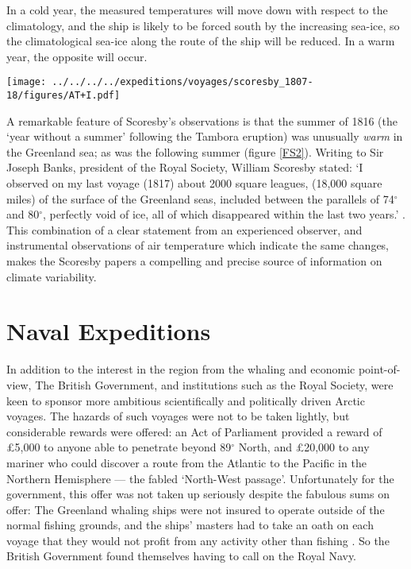 \documentclass[CP]{copernicus}
\begin{document}
In a cold year, the measured temperatures will move down with respect to the climatology, and the ship is likely to be forced south by the increasing sea-ice, so the climatological sea-ice along the route of the ship will be reduced. In a warm year, the opposite will occur.
\begin{figure*}[!hbp]
\begin{center}
\texttt{[image: ../../../../expeditions/voyages/scoresby\_1807-18/figures/AT+I.pdf]}
\caption{Weather observations from William Scoresby's whaling voyages, air temperatures from each of 10 seasons compared with modern values. The red points are the observations, the black and grey lines are the mean, max and min values from modern datasets (monthly averages interpolated to daily, 1979-2004; AT from \citet{rigor97poles}, sea-ice from \citet{rayner03HadISST1}).}
\label{FS2}
\end{center}
\end{figure*}
A remarkable feature of Scoresby's observations is that the summer of 1816 (the `year without a summer' following the Tambora eruption) was unusually {\it warm} in the Greenland sea; as was the following summer (figure \ref{FS2}). Writing to Sir Joseph Banks, president of the Royal Society, William Scoresby stated: `I observed on my last voyage (1817) about 2000 square leagues, (18,000 square miles) of the surface of the Greenland seas, included between the parallels of 74$^\circ$ and 80$^\circ$, perfectly void of ice, all of which disappeared within the last two years.' \citep{barrow_1846}. This combination of a clear statement from an experienced observer, and instrumental observations of air temperature which indicate the same changes, makes the Scoresby papers a compelling and precise source of information on climate variability.

\section{Naval Expeditions}

In addition to the interest in the region from the whaling and economic point-of-view, The British Government, and institutions such as the Royal Society, were keen to sponsor more ambitious scientifically and politically driven Arctic voyages. The hazards of such voyages were not to be taken lightly, but considerable rewards were offered: an Act of Parliament provided a reward of \pounds 5,000 to anyone able to penetrate beyond 89$^\circ$ North, and \pounds 20,000 to any mariner who could discover a route from the Atlantic to the Pacific in the Northern Hemisphere --- the fabled `North-West passage'. Unfortunately for the government, this offer was not taken up seriously despite the fabulous sums on offer: The Greenland whaling ships were not insured to operate outside of the normal fishing grounds, and the ships' masters had to take an oath on each voyage that they would not profit from any activity other than fishing \citep{barringdon_1818}. So the British Government found themselves having to call on the Royal Navy.
\end{document}
